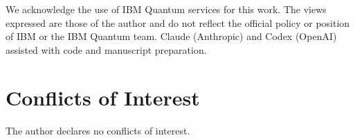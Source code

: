 \documentclass[aps,pra,reprint,nofootinbib,longbibliography,floatfix,showkeys]{revtex4-2}
\begin{document}
\begin{acknowledgments}
We acknowledge the use of IBM Quantum services for this work.
The views expressed are those of the author and do not reflect the official policy or position of IBM or the IBM Quantum team.
Claude (Anthropic) and Codex (OpenAI) assisted with code and manuscript preparation.
\end{acknowledgments}

\section*{Conflicts of Interest}
The author declares no conflicts of interest.


\end{document}
